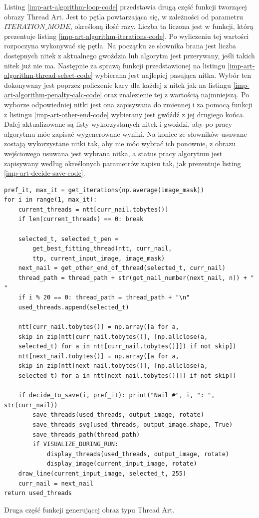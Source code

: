 \documentclass[a4paper, 12pt, polish, twoside]{extreport}
\begin{document}
        Listing \ref{imp-art-algorithm-loop-code} przedstawia drugą część funkcji tworzącej obrazy Thread Art. Jest to pętla powtarzająca się, w zależności od parametru \(ITERATION\_MODE\), określoną ilość razy. Liczba ta liczona jest w funkcji, którą prezentuje listing \ref{imp-art-algorithm-iterations-code}. Po wyliczeniu tej wartości rozpoczyna wykonywać się pętla. Na początku ze słownika brana jest liczba dostępnych nitek z aktualnego gwoździa lub algorytm jest przerywany, jeśli takich nitek już nie ma. Następnie za sprawą funkcji przedstawionej na listingu \ref{imp-art-algorithm-thread-select-code} wybierana jest najlepiej pasująca nitka. Wybór ten dokonywany jest poprzez policzenie kary dla każdej z nitek jak na listingu \ref{imp-art-algorithm-penalty-calc-code} oraz znalezienie tej z wartością najmniejszą. Po wyborze odpowiedniej nitki jest ona zapisywana do zmiennej i za pomocą funkcji z listingu \ref{imp-art-other-end-code} wybierany jest gwóźdź z jej drugiego końca. Dalej aktualizowane są listy wykorzystanych nitek i gwoździ, aby po pracy algorytmu móc zapisać wygenerowane wyniki. Na koniec ze słowników usuwane zostają wykorzystane nitki tak, aby nie móc wybrać ich ponownie, z obrazu wejściowego usuwana jest wybrana nitka, a status pracy algorytmu jest zapisywany według określonych parametrów zapisu tak, jak prezentuje listing \ref{imp-art-decide-save-code}.
        \begin{code}[H]
        \begin{verbatim}
pref_it, max_it = get_iterations(np.average(image_mask))
for i in range(1, max_it):
    current_threads = ntt[curr_nail.tobytes()]
    if len(current_threads) == 0: break 

    selected_t, selected_t_pen =
        get_best_fitting_thread(ntt, curr_nail, 
        ttp, current_input_image, image_mask)
    next_nail = get_other_end_of_thread(selected_t, curr_nail)
    thread_path = thread_path + str(get_nail_number(next_nail, n)) + " "
    if i % 20 == 0: thread_path = thread_path + "\n"
    used_threads.append(selected_t)

    ntt[curr_nail.tobytes()] = np.array([a for a, 
    skip in zip(ntt[curr_nail.tobytes()], [np.allclose(a, 
    selected_t) for a in ntt[curr_nail.tobytes()]]) if not skip])
    ntt[next_nail.tobytes()] = np.array([a for a, 
    skip in zip(ntt[next_nail.tobytes()], [np.allclose(a, 
    selected_t) for a in ntt[next_nail.tobytes()]]) if not skip])
    
    if decide_to_save(i, pref_it): print("Nail #", i, ": ", str(curr_nail))
        save_threads(used_threads, output_image, rotate)
        save_threads_svg(used_threads, output_image.shape, True)
        save_threads_path(thread_path)
        if VISUALIZE_DURING_RUN:
            display_threads(used_threads, output_image, rotate)
            display_image(current_input_image, rotate)
    draw_line(current_input_image, selected_t, 255)
    curr_nail = next_nail
return used_threads
        \end{verbatim}
        \caption{Druga część funkcji generującej obraz typu Thread Art.}
        \label{imp-art-algorithm-loop-code}
        \end{code}
        
\end{document}
